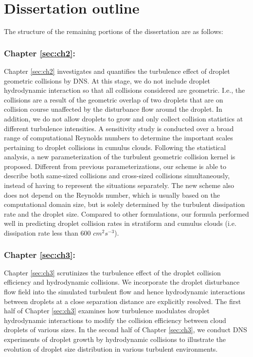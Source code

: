 \section{Dissertation outline}

The structure of the remaining portions of the dissertation are as follows:

\subsubsection{Chapter \ref{sec:ch2}: }
Chapter \ref{sec:ch2} investigates and quantifies the turbulence effect of droplet geometric collisions by DNS. At this stage, we do not include droplet hydrodynamic interaction so that all collisions considered are geometric. I.e., the collisions are a result of the geometric overlap of two droplets that are on collision course unaffected by the disturbance flow around the droplet. In addition, we do not allow droplets to grow and only collect collision statistics at different turbulence intensities. A sensitivity study is conducted over a broad range of computational Reynolds numbers to determine the important scales pertaining to droplet collisions in cumulus clouds. Following the statistical analysis, a new parameterization of the turbulent geometric collision kernel is proposed. Different from previous parameterizations, our scheme is able to describe both same-sized collisions and cross-sized collisions simultaneously, instead of having to represent the situations separately. The new scheme also does not depend on the Reynolds number, which is usually based on the computational domain size, but is solely determined by the turbulent dissipation rate and the droplet size. Compared to other formulations, our formula performed well in predicting droplet collision rates in stratiform and cumulus clouds (i.e. dissipation rate less than 600 $cm^2s^{-3}$).
\subsubsection{Chapter \ref{sec:ch3}: }
Chapter \ref{sec:ch3} scrutinizes the turbulence effect of the droplet collision efficiency and hydrodynamic collisions. We incorporate the droplet disturbance flow field into the simulated turbulent flow and hence hydrodynamic interactions between droplets at a close separation distance are explicitly resolved. The first half of Chapter \ref{sec:ch3} examines how turbulence modulates droplet hydrodynamic interactions to modify the collision efficiency between cloud droplets of various sizes. In the second half of Chapter \ref{sec:ch3}, we conduct DNS experiments of droplet growth by hydrodynamic collisions to illustrate the evolution of droplet size distribution in various turbulent environments.
